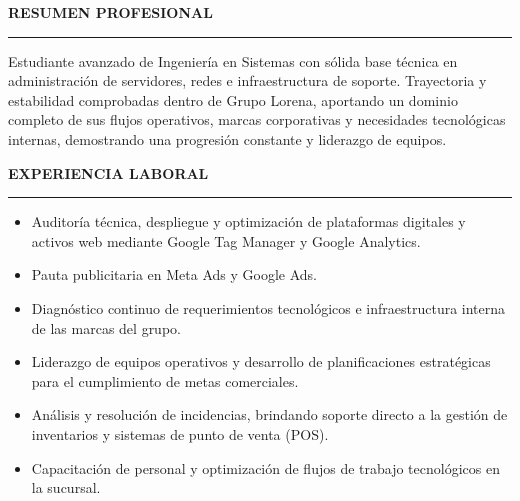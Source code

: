 \documentclass[10pt,a4paper,ragged2e]{Mark_I_Plantilla}
\renewcommand{\cvsection}[2][]{%
  \vspace{0.8ex}%
  \ifstrequal{#1}{}{}{\marginpar{\vspace*{\dimexpr1pt-\baselineskip}\raggedright}}%
  {\color{heading}\Large\bfseries\MakeUppercase{#2}}\\[-1.2ex]%
  {\color{heading}\rule{\linewidth}{1.2pt}\par}\vspace{0.8ex}
}
\renewcommand{\divider}{\vspace{0.2ex}\textcolor{body!30}{\hdashrule{\linewidth}{0.4pt}{0.5ex}}\vspace{0.2ex}}
\begin{document}

\begin{fullwidth}
\makecvheader

\cvsection{RESUMEN PROFESIONAL}

Estudiante avanzado de Ingeniería en Sistemas con sólida base técnica en administración de servidores, redes e infraestructura de soporte. Trayectoria y estabilidad comprobadas dentro de Grupo Lorena, aportando un dominio completo de sus flujos operativos, marcas corporativas y necesidades tecnológicas internas, demostrando una progresión constante y liderazgo de equipos.
\end{fullwidth}


\marginpar{\vspace*{\dimexpr1pt-\baselineskip}\raggedright\cvsidebar}

\cvsection{EXPERIENCIA LABORAL}

\begin{itemize}
  \item Auditoría técnica, despliegue y optimización de plataformas digitales y activos web mediante Google Tag Manager y Google Analytics.
  \item Pauta publicitaria en Meta Ads y Google Ads.
  \item Diagnóstico continuo de requerimientos tecnológicos e infraestructura interna de las marcas del grupo.
\end{itemize}
\divider

\begin{itemize}
  \item Liderazgo de equipos operativos y desarrollo de planificaciones estratégicas para el cumplimiento de metas comerciales.
  \item Análisis y resolución de incidencias, brindando soporte directo a la gestión de inventarios y sistemas de punto de venta (POS).
  \item Capacitación de personal y optimización de flujos de trabajo tecnológicos en la sucursal.
\end{itemize}
\divider
\end{document}
